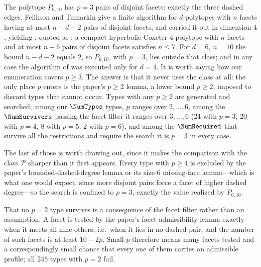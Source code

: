 \documentclass[11pt,reqno]{amsart}
\theoremstyle{plain}
\theoremstyle{definition}
\newcommand{\PP}{P_{6,10}}
\begin{document}
The polytope $\PP$ has $p=3$ pairs of disjoint facets: exactly the three dashed
edges. Felikson and Tumarkin \cite{FeliksonTumarkin2014} give a finite algorithm
for $d$-polytopes with $n$ facets having at most $n-d-2$ pairs of disjoint
facets, and carried it out in dimension $4$, yielding
\cite[Thm.~7.1]{FeliksonTumarkin2014}, quoted as
\cite[Thm.~5.2]{Burcroff2024}: a compact hyperbolic Coxeter $4$-polytope with
$n$ facets and at most $n-6$ pairs of disjoint facets satisfies $n\le7$. For
$d=6$, $n=10$ the bound $n-d-2$ equals $2$, so $\PP$, with $p=3$, lies outside
that class; and in any case the algorithm of \cite{FeliksonTumarkin2014} was
executed only for $d=4$. It is worth saying how our enumeration covers $p\ge3$. The answer is that it never uses the class at all: the only
place $p$ enters is the paper's $p\ge2$ lemma, a lower bound $p\ge2$, imposed to
discard types that cannot occur. Types with any $p\ge2$ are generated and
searched; among our $\NumTypes$ types, $p$ ranges over $2,\dots,6$, among the
$\NumSurvivors$ passing the facet filter it ranges over $3,\dots,6$ ($24$ with
$p=3$, $20$ with $p=4$, $8$ with $p=5$, $2$ with $p=6$), and among the
$\NumRequired$ that survive all the restrictions and require the search it is
$p=3$ in every case.

The last of those is worth drawing out, since it makes the comparison with the
class $\mathcal{P}$ sharper than it first appears. Every type with $p\ge4$ is
excluded by the paper's bounded-dashed-degree lemma or its size-$6$ missing-face
lemma---which is what one would expect, since more disjoint pairs force a facet of
higher dashed degree---so the search is confined to $p=3$, exactly the value
realized by $\PP$.

That no $p=2$ type survives is a consequence of the facet filter rather than an
assumption. A facet is tested by the paper's facet-admissibility lemma exactly when it meets all
nine others, i.e.\ when it lies in no dashed pair, and the number of such facets
is at least $10-2p$. Small $p$ therefore means many facets tested and a
correspondingly small chance that every one of them carries an admissible
profile; all $245$ types with $p=2$ fail.
\end{document}
